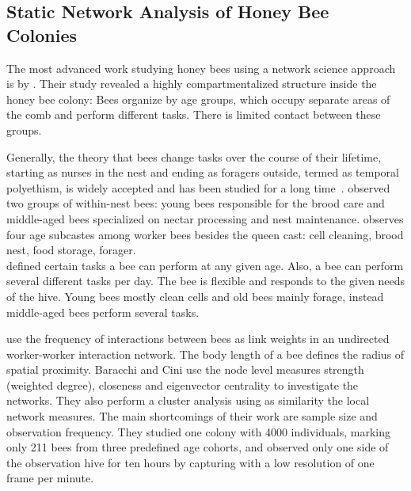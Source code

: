 \subsection{Static Network Analysis of Honey Bee Colonies}

The most advanced work studying honey bees using a network science approach is by \textcite{baracchi2014socio}.
Their study revealed a highly compartmentalized structure inside the honey bee colony:
Bees organize by age groups, which occupy separate areas of the comb and perform different tasks.
There is limited contact between these groups.

Generally, the theory that bees change tasks over the course of their lifetime, starting as nurses in the nest and ending as foragers outside, termed as temporal polyethism,  is widely accepted and has been studied for a long time~\cite{seeley1982adaptive, johnson2008within, lindauer1952beitrag}.
\textcite{johnson2008within} observed two groups of within-nest bees: young bees responsible for the brood care and middle-aged bees specialized on nectar processing and nest maintenance.
\textcite{seeley1982adaptive} observes four age subcastes among worker bees besides the queen cast: cell cleaning, brood nest, food storage, forager.\\
\textcite{lindauer1952beitrag} defined certain tasks a bee can perform at any given age. Also, a bee can perform several different tasks per day. The bee is flexible and responds to the given needs of the hive. Young bees mostly clean cells and old bees mainly forage, instead middle-aged bees perform several tasks.~\cite{lindauer1952beitrag}

\textcite{baracchi2014socio} use the frequency of interactions between bees as link weights in an undirected worker-worker interaction network.
The body length of a bee defines the radius of spatial proximity.
Baracchi and Cini use the node level measures strength (weighted degree), closeness and eigenvector centrality to investigate the networks.
They also perform a cluster analysis using as similarity the local network measures.
The main shortcomings of their work are sample size and observation frequency. They studied one colony with 4000 individuals, marking only 211 bees from three predefined age cohorts, and observed only one side of the observation hive for ten hours by capturing with a low resolution of one frame per minute.

